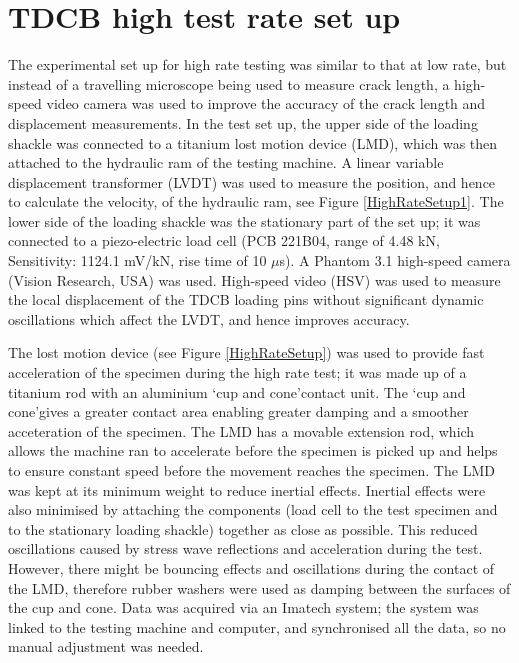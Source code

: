 \documentclass[numbers=noendperiod,chapterprefix=on]{icldt} %
\begin{document}
\section{TDCB high test rate set up}
The experimental set up for high rate testing was similar to that at low rate, but instead of a travelling microscope being used to measure crack length, a high-speed video camera was used to improve the accuracy of the crack length and displacement measurements. 
In the test set up, the upper side of the loading shackle was connected to a titanium lost motion device (LMD), which was then attached to the hydraulic ram of the testing machine. A linear variable displacement transformer (LVDT) was used to measure the position, and hence to calculate the velocity, of the hydraulic ram, see Figure \ref{HighRateSetup1}. 
The lower side of the loading shackle was the stationary part of the set up; it was connected to a piezo-electric load cell (PCB 221B04, range of 4.48 kN, Sensitivity: 1124.1 mV/kN, rise time of 10 $\mu$s). A Phantom 3.1 high-speed camera (Vision Research, USA) was used. High-speed video (HSV) was used to measure the local displacement of the TDCB loading pins without significant dynamic oscillations which affect the LVDT, and hence improves accuracy.

The lost motion device (see Figure \ref{HighRateSetup}) was used to provide fast acceleration of the specimen during the high rate test; it was made up of a titanium rod with an aluminium  \textquoteleft cup and cone\textquoteright \space contact unit. The \textquoteleft cup and cone\textquoteright \space gives a greater contact area enabling greater damping and a smoother acceteration of the specimen. The LMD has a movable extension rod, which allows the machine ran to accelerate before the specimen is picked up and helps to ensure constant speed before the movement reaches the specimen. The LMD was kept at its minimum weight to reduce inertial effects. Inertial effects were also minimised by attaching the components (load cell to the test specimen and to the stationary loading shackle) together as close as possible. This reduced oscillations caused by stress wave reflections and acceleration during the test. However, there might be bouncing effects and oscillations during the contact of the LMD, therefore rubber washers were used as damping between the surfaces of the cup and cone. Data was acquired via an Imatech system; the system was linked to the testing machine and computer, and synchronised all the data, so no manual adjustment was needed.
\end{document}
